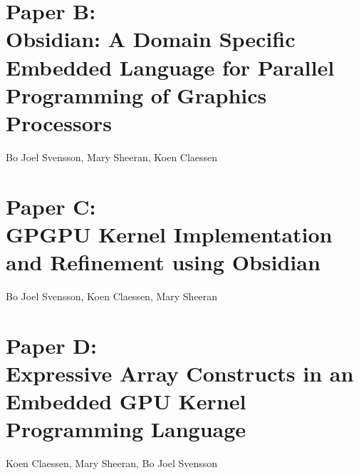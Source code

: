 \documentclass[a4paper]{book}
\newcommand{\paperB}{Paper B}
\newcommand{\paperBTitle}{Obsidian: A Domain Specific Embedded Language for Parallel Programming of Graphics Processors}
\newcommand{\paperC}{Paper C}
\newcommand{\paperCTitle}{GPGPU Kernel Implementation and Refinement using Obsidian}
\newcommand{\paperD}{Paper D}
\newcommand{\paperDTitle}{Expressive Array Constructs in an Embedded GPU Kernel Programming Language}
\begin{document}
\section[\paperBTitle]{\paperB: \\ \paperBTitle}
\label{sec:paperB}


\begin{center} 
Bo Joel Svensson, Mary Sheeran, Koen Claessen
\end{center}



% 
\cleardoublepage 

\section[\paperCTitle]{\paperC: \\ \paperCTitle}
\label{sec:paperC}


\begin{center} 
Bo Joel Svensson, Koen Claessen, Mary Sheeran
\end{center}




% 
\cleardoublepage 

\section[\paperDTitle]{\paperD: \\ \paperDTitle}
\label{sec:paperD}


\begin{center} 
Koen Claessen, Mary Sheeran, Bo Joel Svensson
\end{center}


\end{document}
